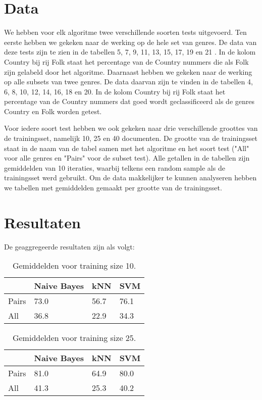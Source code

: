 \documentclass[a4paper,oneside]{article}
\begin{document}
\section{Data}
We hebben voor elk algoritme twee verschillende soorten tests uitgevoerd. Ten eerste hebben we gekeken naar de werking op de hele set van genres. De data van deze tests zijn te zien in de tabellen 5, 7, 9, 11, 13, 15, 17, 19 en 21 . In de kolom Country bij rij Folk staat het percentage van de Country nummers die als Folk zijn gelabeld door het algoritme. Daarnaast hebben we gekeken naar de werking  op alle subsets van twee genres. De data daarvan zijn te vinden in de tabellen 4, 6, 8, 10, 12, 14, 16, 18 en 20. In de kolom Country bij rij Folk staat het percentage van de Country nummers dat goed wordt geclassificeerd als de genres Country en Folk worden getest.

Voor iedere soort test hebben we ook gekeken naar drie verschillende groottes van de trainingsset, namelijk 10, 25 en 40 documenten. De grootte van de trainingsset staat in de naam van de tabel samen met het algoritme en het soort test ("All" voor alle genres en "Pairs" voor de subset test). Alle getallen in de tabellen zijn gemiddelden van 10 iteraties, waarbij telkens een random sample als de trainingsset werd gebruikt. Om de data makkelijker te kunnen analyseren hebben we tabellen met gemiddelden gemaakt per grootte van de trainingsset.

\section{Resultaten}
De geaggregeerde resultaten zijn als volgt:

\begin{table}[H]\centering
\caption{Gemiddelden voor training size 10.}
\begin{tabu}{l|l|l|l}
& Naive Bayes & kNN & SVM \\ \hline
Pairs & 73.0 & 56.7 & 76.1 \\
All & 36.8 & 22.9 & 34.3 \\
\end{tabu}
\end{table}

\begin{table}[H]\centering
\caption{Gemiddelden voor training size 25.}
\begin{tabu}{l|l|l|l}
& Naive Bayes & kNN & SVM \\ \hline
Pairs & 81.0 & 64.9 & 80.0 \\
All & 41.3 & 25.3 & 40.2 \\
\end{tabu}
\end{table}
\end{document}
